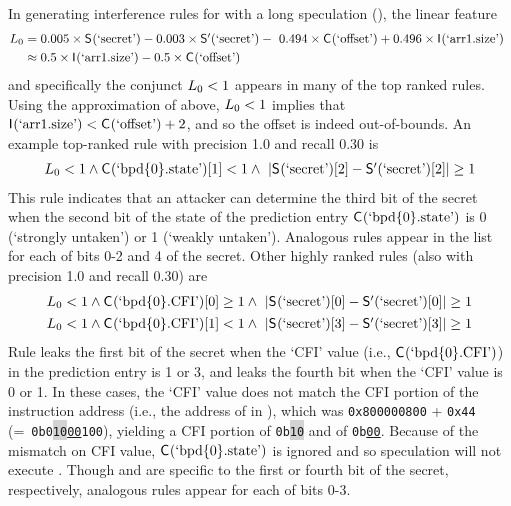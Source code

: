 In generating interference rules for \proc with a long speculation
(), the linear feature
\begin{align*}
  \linearFeature{0} &
  = \begin{array}[t]{@{}l}
    0.005\times\SecFn{}(\secretVar)-0.003\times\SecFnAlt{}(\secretVar)
    -~0.494\times\ACIFn{}(\text{`offset'})+0.496\times\AIIFn{}(\text{`arr1.size'})
    \end{array}\\
  & \approx 0.5\times\AIIFn{}(\text{`arr1.size'}) - 0.5\times\ACIFn{}(\text{`offset'})
\end{align*}
and specifically the conjunct $L_{0} < 1$ appears in many
of the top ranked rules.  Using the approximation of 
above, $L_{0} < 1$ implies that
$\mathsf{I}_{}(\text{`arr1.size'}) < \mathsf{C}_{}(\text{`offset'}) + 2$, and so
the offset is indeed out-of-bounds.  An example top-ranked rule with
precision 1.0 and recall 0.30 is
\[
\begin{array}{r}
  \linearFeature{0}<1 \wedge \ACIFn{}(\bpdState{0})[1]<1 
  \wedge~\hfill\diffFeature{2}\ge 1 
\end{array}
\]
This rule indicates that an attacker can determine the third bit of
the secret when the second bit of the state of the prediction entry
$\mathsf{C}_{}(\textrm{`bpd\{$0$\}.state'})$ is 0 (`strongly untaken') or 1 (`weakly
untaken').  Analogous rules appear in the list for each of bits 0-2
and 4 of the secret.  Other highly ranked rules (also with precision
1.0 and recall 0.30) are
\begin{align}
\begin{array}{r}
  \linearFeature{0}<1 \wedge \ACIFn{}(\bpdCFI{0})[0]\ge 1
  \wedge~\hfill\diffFeature{0}\ge 1
\end{array}
\label{eqn:spec-ruleTwo}\\
\begin{array}{r}
  \linearFeature{0}<1 \wedge \ACIFn{}(\bpdCFI{0})[1]<1 
  \wedge~\hfill\diffFeature{3}\ge 1 
\end{array}
\label{eqn:spec-ruleThree}
\end{align}
Rule  leaks the first bit of the secret when
the `CFI' value (i.e., $\mathsf{C}_{}(\textrm{`bpd\{$0$\}.CFI'})$) in the prediction entry
is 1 or 3, and  leaks the fourth bit when
the `CFI' value is 0 or 1.  In these cases, the `CFI' value does not
match the CFI portion of the instruction address (i.e., the address of
 in ),
which was \texttt{0x800000800} + \texttt{0x44}
(=~\texttt{0b0\colorbox{lightgrey}{10}\underline{00}100}), yielding a
CFI portion of \texttt{0b\colorbox{lightgrey}{10}} and \bpdIdx of
\texttt{0b\underline{00}}.  Because of the mismatch on CFI value,
$\mathsf{C}_{}(\textrm{`bpd\{$0$\}.state'})$ is ignored and so speculation will not
execute
.
Though  and  are
specific to the first or fourth bit of the secret, respectively,
analogous rules appear for each of bits 0-3.

